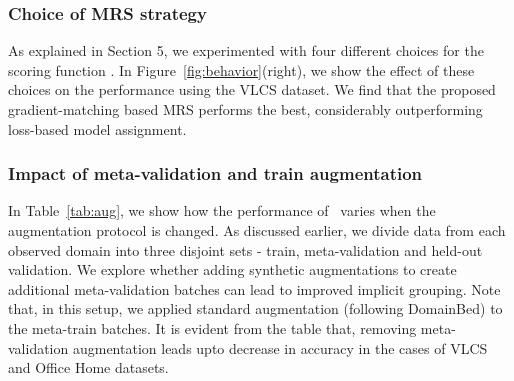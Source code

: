 \subsubsection{Choice of MRS strategy}As explained in Section 5, we experimented with four different choices for the scoring function . In Figure~\ref{fig:behavior}(right), we show the effect of these choices on the performance using the VLCS dataset. We find that the proposed gradient-matching based MRS performs the best, considerably outperforming loss-based model assignment.

\subsubsection{Impact of meta-validation and train augmentation} 

In Table~\ref{tab:aug}, we show how the performance of \muld~varies when the augmentation protocol is changed. As discussed earlier, we divide data from each observed domain into three disjoint sets - train, meta-validation and held-out validation. We explore whether adding synthetic augmentations to create additional meta-validation batches can lead to improved implicit grouping. Note that, in this setup, we applied standard augmentation (following DomainBed) to the meta-train batches. It is evident from the table that, removing meta-validation augmentation leads upto  decrease in accuracy in the cases of VLCS and Office Home datasets.   

